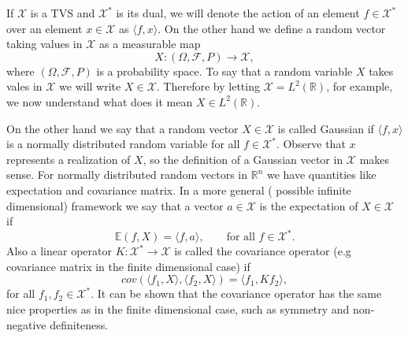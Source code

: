 \documentclass[12pt]{book}
\newcommand{\E}{\mathbb{E}} %
\newcommand{\tvs}{\mathscr{X}} %
\begin{document}
If $\mathscr{X}$ is a TVS and $\mathscr{X}^{*}$ is its dual, we will denote the action of an 
element $f\in\tvs^{*}$ over an element $x\in\tvs$ as $\langle f,x\rangle$. On the other
hand we  define a random vector taking values in $\tvs$ as a measurable map 
\begin{equation*}
X:(\Omega,\mathscr{F},P)\longrightarrow\tvs,
\end{equation*}
where $(\Omega,\mathscr{F},P)$ is a probability space. To say that 
a random variable  $X$ takes vales in $\tvs$ we will write $X\in\tvs$. 
Therefore by letting $\tvs=L^{2}(\mathbb{R})$, for 
example, we now understand what does it mean $X\in L^{2}(\mathbb{R})$.

On the other hand we say that a random vector $X\in\tvs$ is called Gaussian if $\langle f,x\rangle$ is
a normally distributed random variable for all $f\in\tvs^{*}$. Observe that $x$ represents  a realization
of $X$, so the definition of a Gaussian vector in $\tvs$ makes sense. For normally
distributed random vectors in $\mathbb{R}^{n}$ we have quantities like expectation and covariance matrix.
In a more   general ( possible infinite dimensional) framework we say that a vector $a\in\tvs$ is the 
expectation of $X\in\tvs$ if 
\begin{equation*}
\E(f,X)=\langle f, a\rangle,\qquad\text{for all }f\in\tvs^{*}.
\end{equation*}
Also a linear operator $K:\tvs^{*}\longrightarrow \tvs$ is called the covariance operator (e.g covariance
matrix in the finite dimensional case) if
\begin{equation*}
cov(\langle f_{1},X\rangle,\langle f_{2},X\rangle)=\langle f_{1},Kf_{2}\rangle,
\end{equation*}
for all $f_{1},f_{2}\in\tvs^{*}$. It can be shown that the covariance operator has the same nice properties
as in the finite dimensional case, such as symmetry and non-negative definiteness. 
\newline
\end{document}
